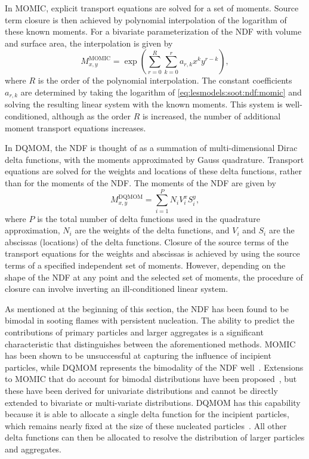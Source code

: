 In MOMIC, explicit transport equations are solved for a set of moments. Source term closure is then achieved by polynomial interpolation of the logarithm of these known moments. For a bivariate parameterization of the NDF with volume and surface area, the interpolation is given by
\begin{equation}\label{eq:lesmodels:soot:ndf:momic}
  M_{x,y}^{\text{MOMIC}} = \exp\left( \sum\limits_{r=0}^{R} \sum\limits_{k=0}^{r} a_{r,k}x^k y^{r-k} \right),
\end{equation}
where $R$ is the order of the polynomial interpolation. The constant coefficients $a_{r,k}$ are determined by taking the logarithm of \cref{eq:lesmodels:soot:ndf:momic} and solving the resulting linear system with the known moments. This system is well-conditioned, although as the order $R$ is increased, the number of additional moment transport equations increases.

In DQMOM, the NDF is thought of as a summation of multi-dimensional Dirac delta functions, with the moments approximated by Gauss quadrature. Transport equations are solved for the weights and locations of these delta functions, rather than for the moments of the NDF. The moments of the NDF are given by
\begin{equation}\label{eq:lesmodels:soot:ndf:dqmom}
  M_{x,y}^{\text{DQMOM}} = \sum\limits_{i=1}^{P} N_i V_i^x S_i^y,
\end{equation}
where $P$ is the total number of delta functions used in the quadrature approximation, $N_i$ are the weights of the delta functions, and $V_i$ and $S_i$ are the abscissas (locations) of the delta functions. Closure of the source terms of the transport equations for the weights and abscissas is achieved by using the source terms of a specified independent set of moments. However, depending on the shape of the NDF at any point and the selected set of moments, the procedure of closure can involve inverting an ill-conditioned linear system.

As mentioned at the beginning of this section, the NDF has been found to be bimodal in sooting flames with persistent nucleation. The ability to predict the contributions of primary particles and larger aggregates is a significant characteristic that distinguishes between the aforementioned methods. MOMIC has been shown to be unsuccessful at capturing the influence of incipient particles, while DQMOM represents the bimodality of the NDF well~\cite{mueller2009}. Extensions to MOMIC that do account for bimodal distributions have been proposed~\cite{frenklach2002}, but these have been derived for univariate distributions and cannot be directly extended to bivariate or multi-variate distributions. DQMOM has this capability because it is able to allocate a single delta function for the incipient particles, which remains nearly fixed at the size of these nucleated particles~\cite{blanquart2009}. All other delta functions can then be allocated to resolve the distribution of larger particles and aggregates.

